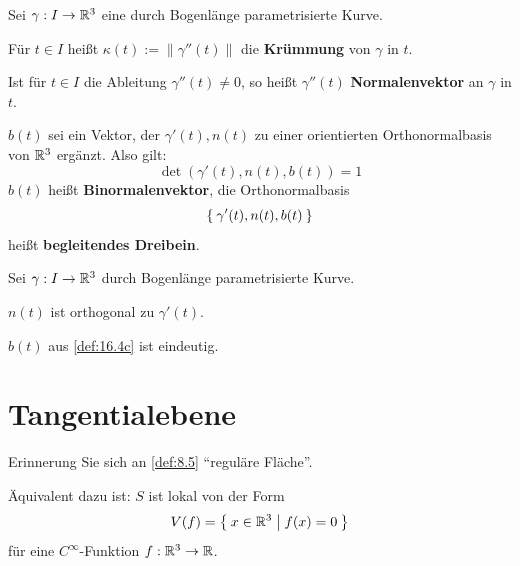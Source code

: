 \begin{definition}%
    Sei $\gamma: I \rightarrow \mathbb{R}^3$ eine durch Bogenlänge parametrisierte
    Kurve.

    \begin{defenum}
        \item Für $t \in I$ heißt $\kappa(t) := \|\gamma''(t)\|$ die
              \textbf{Krümmung} von $\gamma$ in $t$.
        \item Ist für $t \in I$ die Ableitung $\gamma''(t) \neq 0$,
              so heißt $\gamma''(t)$ \textbf{Normalenvektor}
              an $\gamma$ in $t$.
        \item \label{def:16.4c} $b(t)$ sei ein Vektor, der $\gamma'(t), n(t)$
              zu einer orientierten Orthonormalbasis von $\mathbb{R}^3$ ergänzt.
              Also gilt:
              \[\det(\gamma'(t), n(t), b(t)) = 1\]
              $b(t)$ heißt \textbf{Binormalenvektor},
              die Orthonormalbasis 
              \[\Set{\gamma'(t), n(t), b(t)}\]
              heißt \textbf{begleitendes Dreibein}.
    \end{defenum}
\end{definition}

\begin{bemerkung}%
    Sei $\gamma: I \rightarrow \mathbb{R}^3$ durch Bogenlänge parametrisierte
    Kurve.

    \begin{bemenum}
        \item $n(t)$ ist orthogonal zu $\gamma'(t)$.
        \item $b(t)$ aus \cref{def:16.4c} ist eindeutig.
    \end{bemenum}
\end{bemerkung}

\section{Tangentialebene}
Erinnerung Sie sich an \cref{def:8.5} \enquote{reguläre Fläche}.

Äquivalent dazu ist: $S$ ist lokal von der Form
\[V(f) = \Set{x \in \ensuremath{\mathbb{R}}^3 | f(x) = 0 }\]
für eine $C^\infty$-Funktion $f: \mathbb{R}^3 \rightarrow \mathbb{R}$.

